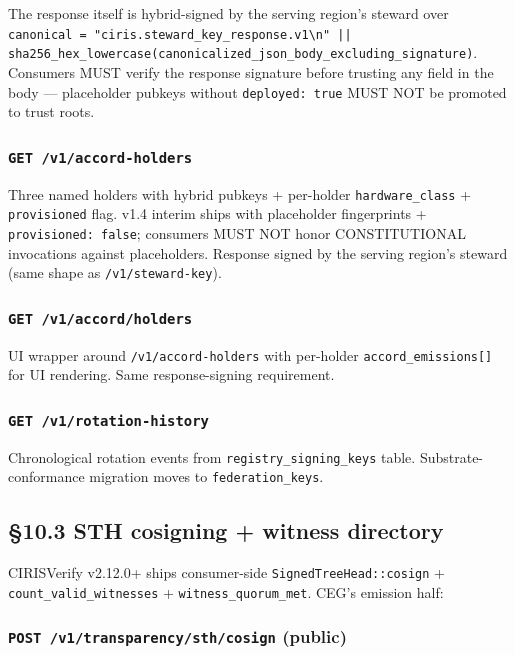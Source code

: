 \documentclass[10pt]{article}
\begin{document}
The response itself is hybrid-signed by the serving region's steward over \texttt{canonical = "ciris.steward\_key\_response.v1\textbackslash{}n" || sha256\_hex\_lowercase(canonicalized\_json\_body\_excluding\_signature)}. Consumers MUST verify the response signature before trusting any field in the body — placeholder pubkeys without \texttt{deployed: true} MUST NOT be promoted to trust roots.


\subsubsection*{\texttt{GET /v1/accord-holders}}


Three named holders with hybrid pubkeys + per-holder \texttt{hardware\_class} + \texttt{provisioned} flag. v1.4 interim ships with placeholder fingerprints + \texttt{provisioned: false}; consumers MUST NOT honor CONSTITUTIONAL invocations against placeholders. Response signed by the serving region's steward (same shape as \texttt{/v1/steward-key}).


\subsubsection*{\texttt{GET /v1/accord/holders}}


UI wrapper around \texttt{/v1/accord-holders} with per-holder \texttt{accord\_emissions[]} for UI rendering. Same response-signing requirement.


\subsubsection*{\texttt{GET /v1/rotation-history}}


Chronological rotation events from \texttt{registry\_signing\_keys} table. Substrate-conformance migration moves to \texttt{federation\_keys}.


\subsection*{§10.3 STH cosigning + witness directory}


CIRISVerify v2.12.0+ ships consumer-side \texttt{SignedTreeHead::cosign} + \texttt{count\_valid\_witnesses} + \texttt{witness\_quorum\_met}. CEG's emission half:


\subsubsection*{\texttt{POST /v1/transparency/sth/cosign} (public)}
\end{document}
